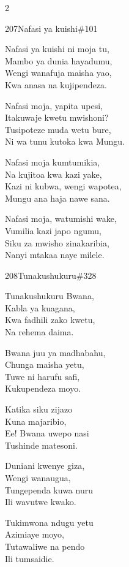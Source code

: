 \documentclass{article}
\begin{document}
\begin{multicols}{2}
\begin{hymn}{207}{Nafasi ya kuishi}{\#101}
\begin{stanza}
Nafasi ya kuishi ni moja tu,\\
Mambo ya dunia hayadumu,\\
Wengi wanafuja maisha yao,\\
Kwa anasa na kujipendeza.
\end{stanza}
\begin{stanza}
Nafasi moja, yapita upesi,\\
Itakuwaje kwetu mwishoni?\\
Tusipoteze muda wetu bure,\\
Ni wa tunu kutoka kwa Mungu.
\end{stanza}
\begin{stanza}
Nafasi moja kumtumikia,\\
Na kujitoa kwa kazi yake,\\
Kazi ni kubwa, wengi wapotea,\\
Mungu ana haja nawe sana.
\end{stanza}
\begin{stanza}
Nafasi moja, watumishi wake,\\
Vumilia kazi japo ngumu,\\
Siku za mwisho zinakaribia,\\
Nanyi mtakaa naye milele.
\end{stanza}
\end{hymn}

\begin{hymn}{208}{Tunakushukuru}{\#328}
\begin{stanza}
Tunakushukuru Bwana,\\
Kabla ya kuagana,\\
Kwa fadhili zako kwetu,\\
Na rehema daima.
\end{stanza}
\begin{chorus}
Bwana juu ya madhabahu,\\
Chunga maisha yetu,\\
Tuwe ni harufu safi,\\
Kukupendeza moyo.
\end{chorus}
\begin{stanza}
Katika siku zijazo\\
Kuna majaribio,\\
Ee! Bwana uwepo nasi\\
Tushinde matesoni.
\end{stanza}
\begin{stanza}
Duniani kwenye giza,\\
Wengi wanaugua,\\
Tungependa kuwa nuru\\
Ili wavutwe kwako.
\end{stanza}
\begin{stanza}
Tukimwona ndugu yetu\\
Azimiaye moyo,\\
Tutawaliwe na pendo\\
Ili tumsaidie.
\end{stanza}
\end{hymn}


\end{multicols}
\end{document}

